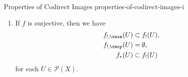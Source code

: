 \begin{proposition}{Properties of Codirect Images \rmI}{properties-of-codirect-images-i}
\begin{enumerate}
\begin{gather*}
\begin{aligned}
                    f_{*}(U)       &= f_{!,\rmim}(U)\cup f_{!,\rmcp}(U)\\
                                   &= f_{!}(U)\cup(Y\setminus\Im(f))
                \end{aligned}
            \end{gather*}
            for each $U\in\mathcal{P}(X)$.
        \item\label{properties-of-codirect-images-i-interaction-with-surjections}If $f$ is surjective, then we have
            \begin{align*}
                f_{!,\rmim}(U) &\subset  f_{!}(U),\\
                f_{!,\rmcp}(U) &=       \emptyset,\\
                f_{*}(U)       &\subset f_{!}(U)
            \end{align*}
            for each $U\in\mathcal{P}(X)$.
    \end{enumerate}
\end{proposition}
